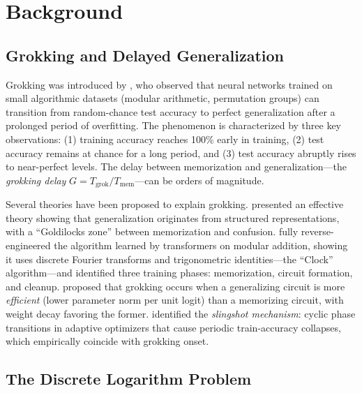 \documentclass[11pt]{article}
\newcommand{\Tmem}{T_{\mathrm{mem}}}
\newcommand{\Tgrok}{T_{\mathrm{grok}}}
\newcommand{\Gdelay}{G}
\begin{document}

\section{Background}
\label{sec:background}

\subsection{Grokking and Delayed Generalization}

Grokking was introduced by \citet{power2022grokking}, who observed that neural networks trained on small algorithmic datasets (modular arithmetic, permutation groups) can transition from random-chance test accuracy to perfect generalization after a prolonged period of overfitting. The phenomenon is characterized by three key observations: (1) training accuracy reaches 100\% early in training, (2) test accuracy remains at chance for a long period, and (3) test accuracy abruptly rises to near-perfect levels. The delay between memorization and generalization---the \emph{grokking delay} $\Gdelay = \Tgrok / \Tmem$---can be orders of magnitude.

Several theories have been proposed to explain grokking. \citet{liu2022understanding} presented an effective theory showing that generalization originates from structured representations, with a ``Goldilocks zone'' between memorization and confusion. \citet{nanda2023progress} fully reverse-engineered the algorithm learned by transformers on modular addition, showing it uses discrete Fourier transforms and trigonometric identities---the ``Clock'' algorithm---and identified three training phases: memorization, circuit formation, and cleanup. \citet{varma2023explaining} proposed that grokking occurs when a generalizing circuit is more \emph{efficient} (lower parameter norm per unit logit) than a memorizing circuit, with weight decay favoring the former. \citet{thilak2022slingshot} identified the \emph{slingshot mechanism}: cyclic phase transitions in adaptive optimizers that cause periodic train-accuracy collapses, which empirically coincide with grokking onset.

\subsection{The Discrete Logarithm Problem}
\end{document}
